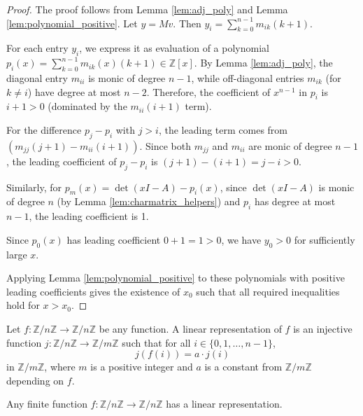\begin{proof}
The proof follows from Lemma \ref{lem:adj_poly} and Lemma \ref{lem:polynomial_positive}.
Let $y = Mv$. Then $y_i = \sum_{k=0}^{n-1} m_{ik} (k+1)$.

For each entry $y_i$, we express it as evaluation of a polynomial $p_i(x) = \sum_{k=0}^{n-1} m_{ik}(x) (k+1) \in \mathbb{Z}[x]$.
By Lemma \ref{lem:adj_poly}, the diagonal entry $m_{ii}$ is monic of degree $n-1$, while off-diagonal entries $m_{ik}$ (for $k \neq i$) have degree at most $n-2$.
Therefore, the coefficient of $x^{n-1}$ in $p_i$ is $i+1 > 0$ (dominated by the $m_{ii} (i+1)$ term).

For the difference $p_j - p_i$ with $j > i$, the leading term comes from $(m_{jj} (j+1) - m_{ii} (i+1))$. Since both $m_{jj}$ and $m_{ii}$ are monic of degree $n-1$, the leading coefficient of $p_j - p_i$ is $(j+1) - (i+1) = j - i > 0$.

Similarly, for $p_m(x) = \det(x I - A) - p_i(x)$, since $\det(x I - A)$ is monic of degree $n$ (by Lemma \ref{lem:charmatrix_helpers}) and $p_i$ has degree at most $n-1$, the leading coefficient is 1.

Since $p_0(x)$ has leading coefficient $0+1 = 1 > 0$, we have $y_0 > 0$ for sufficiently large $x$.

Applying Lemma \ref{lem:polynomial_positive} to these polynomials with positive leading coefficients gives the existence of $x_0$ such that all required inequalities hold for $x > x_0$.
\end{proof}

\begin{definition}
\label{def:linear_representation}
\leanok
Let $f: \mathbb{Z}/n\mathbb{Z} \to \mathbb{Z}/n\mathbb{Z}$ be any function. A linear representation of $f$ is an injective function $j: \mathbb{Z}/n\mathbb{Z} \to \mathbb{Z}/m\mathbb{Z}$ 
such that for all $i\in \{0,1,\ldots,n-1\}$,
$$j(f(i)) = a \cdot j(i)$$
in $\mathbb{Z}/m\mathbb{Z}$, where $m$ is a positive integer and $a$ is a constant from $\mathbb{Z}/m\mathbb{Z}$ depending on $f$.
\end{definition}

\begin{theorem}
\label{thm:linear_representation}
\leanok
{}
Any finite function $f: \mathbb{Z}/n\mathbb{Z} \to \mathbb{Z}/n\mathbb{Z}$ has a linear representation.
\end{theorem}

